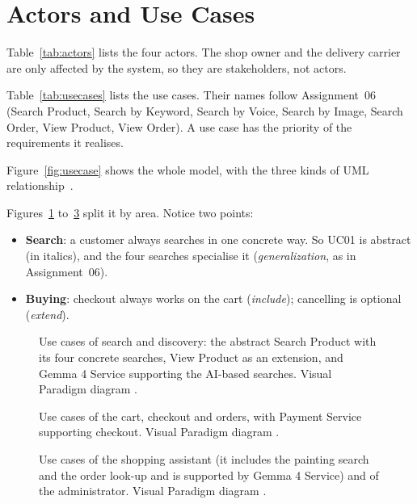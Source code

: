 \section{Actors and Use Cases}\label{sec:1.10}

Table~\ref{tab:actors} lists the four actors. The shop owner and the delivery carrier are only affected by the
system, so they are stakeholders, not actors.



Table~\ref{tab:usecases} lists the use cases. Their names follow Assignment~06 (Search Product, Search by Keyword, Search by Voice, Search by Image, Search
Order, View Product, View Order). A use case has the priority of the requirements it realises.



Figure~\ref{fig:usecase} shows the whole model, with the three kinds of UML relationship~\cite{uml}.


Figures~\ref{fig:c2_uc_search} to~\ref{fig:c2_uc_assistant_admin} split it by area. Notice two points:
\begin{itemize}
\item \textbf{Search}: a customer always searches in one concrete way. So UC01 is abstract (in italics), and the
four searches specialise it (\emph{generalization}, as in Assignment~06).
\item \textbf{Buying}: checkout always works on the cart (\emph{include}); cancelling is optional (\emph{extend}).
\end{itemize}

\begin{figure}[H]
\centering
{}
\caption[Use cases: search and discovery]{Use cases of search and discovery: the abstract Search Product with its four concrete searches, View Product as an extension, and Gemma 4 Service supporting the AI-based searches. Visual Paradigm diagram .}\label{fig:c2_uc_search}
\end{figure}
\begin{figure}[H]
\centering
{}
\caption[Use cases: cart, checkout and orders]{Use cases of the cart, checkout and orders, with Payment Service supporting checkout. Visual Paradigm diagram .}\label{fig:c2_uc_purchase}
\end{figure}
\begin{figure}[H]
\centering
{}
\caption[Use cases: assistant and administration]{Use cases of the shopping assistant (it includes the painting search and the order look-up and is supported by Gemma 4 Service) and of the administrator. Visual Paradigm diagram .}\label{fig:c2_uc_assistant_admin}
\end{figure}


